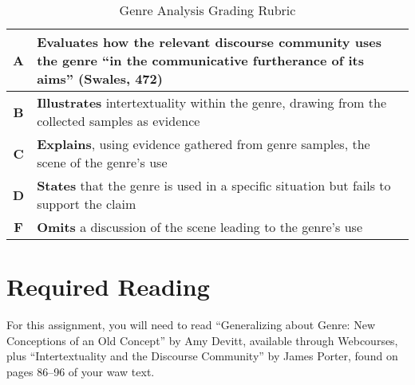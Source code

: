 \documentclass[10pt, oneside, twocolumn]{amsart}	%
\begin{document}
\begin{table}[b]
	\caption{Genre Analysis Grading Rubric}\label{tab:rubric}
\begin{tabulary}{\columnwidth}{cJ}


\toprule \textbf{A} & \textbf{Evaluates} how the relevant discourse community uses the genre ``in the communicative furtherance of its aims'' (Swales, 472)		\\
\midrule \textbf{B} & \textbf{Illustrates} intertextuality within the genre, drawing from the collected samples as evidence		\\
\midrule \textbf{C} & \textbf{Explains}, using evidence gathered from genre samples, the scene of the genre's use		\\
\midrule \textbf{D} & \textbf{States} that the genre is used in a specific situation but fails to support the claim		\\
\midrule \textbf{F} & \textbf{Omits} a discussion of the scene leading to the genre's use		\\


	\bottomrule
\end{tabulary}
\end{table}


\section{Required Reading} %
	\label{sec:readings}
	For this assignment, you will need to read ``Generalizing about Genre: New Conceptions of an Old Concept'' by Amy Devitt, available through Webcourses, plus ``Intertextuality and the Discourse Community'' by James Porter, found on pages 86--96 of your \ac{waw} text.
\end{document}

